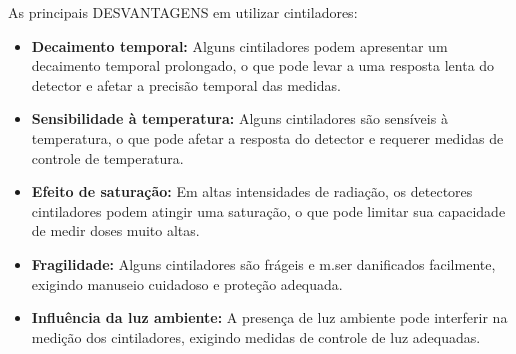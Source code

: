 \documentclass[11pt,a4paper]{article}
\begin{document}
		As principais \textcolor{CarnationPink}{DESVANTAGENS}  em utilizar cintiladores:

		\begin{itemize}[label=\textcolor{CarnationPink}{$\blacktriangleright$}]
			\item \textbf{Decaimento temporal:} Alguns cintiladores podem apresentar um decaimento temporal prolongado, o que pode levar a uma resposta lenta do detector e afetar a precisão temporal das medidas.
			\item \textbf{Sensibilidade à temperatura:} Alguns cintiladores são sensíveis à temperatura, o que pode afetar a resposta do detector e requerer medidas de controle de temperatura.
			\item \textbf{Efeito de saturação:} Em altas intensidades de radiação, os detectores cintiladores podem atingir uma saturação, o que pode limitar sua capacidade de medir doses muito altas.
			\item \textbf{Fragilidade:} Alguns cintiladores são frágeis e 
			m.\ZXCVpodem ser danificados facilmente, exigindo manuseio cuidadoso e proteção adequada.			\item \textbf{Influência da luz ambiente:} A presença de luz ambiente pode interferir na medição dos cintiladores, exigindo medidas de controle de luz adequadas.
		\end{itemize}

		




\end{document}
